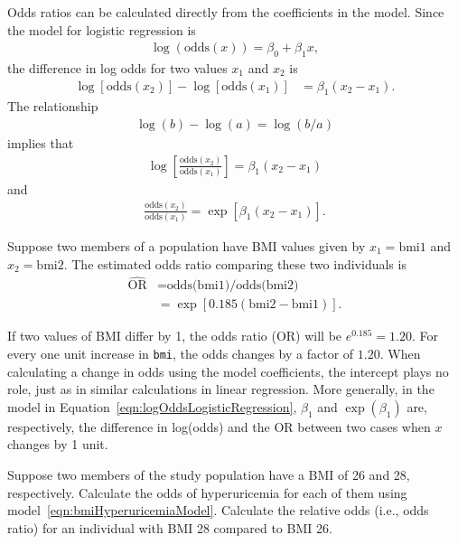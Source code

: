 Odds ratios can be calculated directly from the coefficients in the model. Since the model for logistic regression is
\begin{align*}
  \log(\text{odds}(x)) = \beta_0 + \beta_1 x,
\end{align*}
the difference in log odds for two values $x_1$ and $x_2$ is
\begin{align*}
  \log[\text{odds}(x_2)] - \log[\text{odds}(x_1)] &= \beta_1(x_2 - x_1).
\end{align*}
The relationship
\begin{align*}
  \log(b) - \log(a) = \log(b/a)
\end{align*}
implies that
\begin{align*}
  \log\left[\frac{\text{odds}(x_2)}{\text{odds}(x_1)}\right] = \beta_1(x_2 - x_1)
\end{align*}
and
\begin{align}
  \frac{\text{odds}(x_2)}{\text{odds}(x_1)} = \exp[\beta_1(x_2 - x_1)].
  \label{eqn:oddsRatioLogisticRegression}
\end{align}

Suppose two members of a population have BMI values given by $x_1=\text{bmi1}$ and $x_2 = \text{bmi2}$. The estimated odds ratio comparing these two individuals is
\begin{align*}
  \widehat{\text{OR}} &= \text{odds(bmi1)/odds(bmi2)} \\
  &= \exp[0.185(\text{bmi2} - \text{bmi1})].
\end{align*}

If two values of BMI differ by 1, the odds ratio (OR) will be $e^{0.185} = 1.20$. For every one unit increase in \texttt{bmi}, the odds changes by a factor of $1.20$. When calculating a change in odds using the model coefficients, the intercept plays no role, just as in similar calculations in linear regression.  More generally, in the model in Equation~\ref{eqn:logOddsLogisticRegression}, $\beta_1$ and $\exp(\beta_1)$ are, respectively, the difference in log(odds) and the OR between two cases when $x$ changes by 1 unit.

\begin{exercisewrap}
\begin{nexercise}
  Suppose two members of the study population have a BMI of 26 and 28, respectively.  Calculate the odds of hyperuricemia for each of them using
model~\ref{eqn:bmiHyperuricemiaModel}.  Calculate the relative odds (i.e., odds ratio) for an individual with BMI 28 compared to BMI 26.
\footnotemark{}
\end{nexercise}
\end{exercisewrap}

